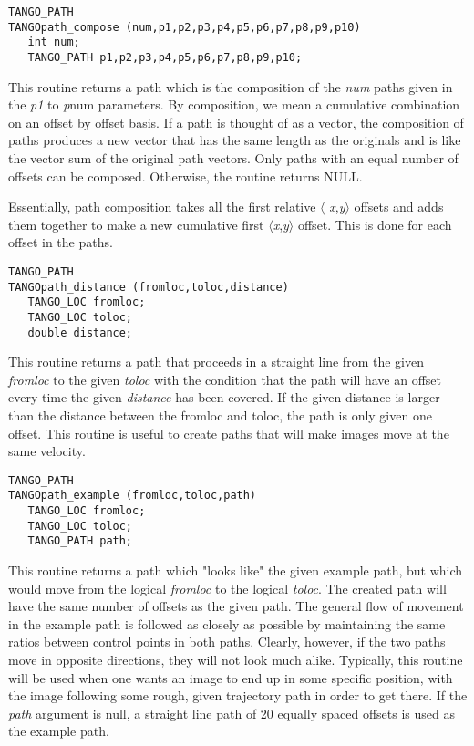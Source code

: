 \vspace{1em}
\begin{verbatim}
TANGO_PATH
TANGOpath_compose (num,p1,p2,p3,p4,p5,p6,p7,p8,p9,p10) 
   int num;
   TANGO_PATH p1,p2,p3,p4,p5,p6,p7,p8,p9,p10;
\end{verbatim}
This routine returns a path which is the composition of the {\em num} paths
given in the {\em p1} to {\em p}num parameters.  By composition, we mean a
cumulative combination on an offset by offset basis. If a path is thought of
as a vector, the composition of paths produces a new vector that has the same
length as the originals and is like the vector sum of the original
path vectors.  Only paths with an equal number of offsets can be
composed.  Otherwise, the routine returns NULL.

Essentially, path composition takes all the first relative $\langle${\em
x},{\em y}$\rangle$
offsets and adds them together to make a new cumulative first
$\langle${\em x},{\em y}$\rangle$ offset. This is done for each offset in the paths.

\vspace{1em}
\begin{verbatim}
TANGO_PATH
TANGOpath_distance (fromloc,toloc,distance) 
   TANGO_LOC fromloc;
   TANGO_LOC toloc;
   double distance;
\end{verbatim}
This routine returns a path that proceeds in a straight line from the given
{\em fromloc} to the given {\em toloc} with the condition that the path will
have an offset every time the given {\em distance} has been covered.  If the
given distance is larger than the distance between the fromloc and toloc, the
path is only given one offset.  This routine is useful to create paths that
will make images move at the same velocity.

\vspace{1em}
\begin{verbatim}
TANGO_PATH
TANGOpath_example (fromloc,toloc,path) 
   TANGO_LOC fromloc;
   TANGO_LOC toloc;
   TANGO_PATH path;
\end{verbatim}
This routine returns a path which "looks like" the given example path, but
which would move from the logical {\em fromloc} to the logical {\em toloc}.
The created path will have the same number of offsets as the given path. The
general flow of movement in the example path is followed as closely as
possible by maintaining the same ratios between control points in both
paths. Clearly, however, if the two paths move in opposite directions, they
will not look much alike.  Typically, this routine will be used when one wants
an image to end up in some specific position, with the image following some
rough, given trajectory path in order to get there.  If the {\em path}
argument is null, a straight line path of 20 equally spaced offsets is used as
the example path.


